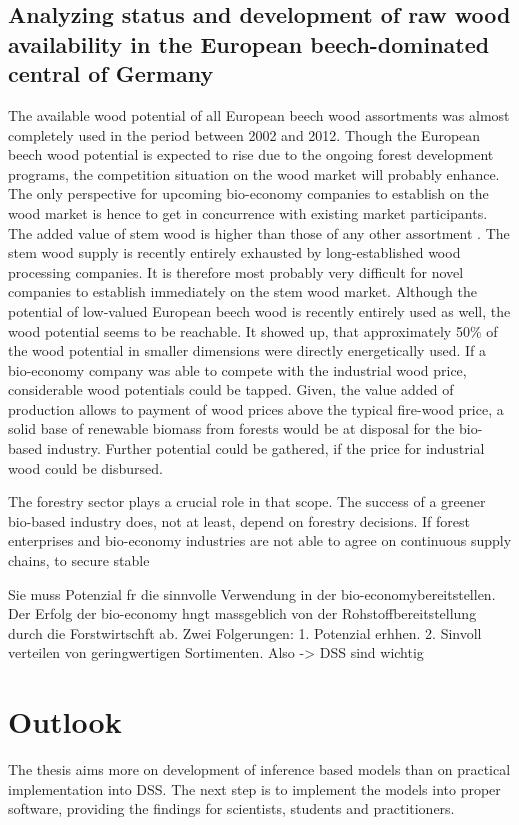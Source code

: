 \subsection{Analyzing status and development of raw wood availability in the European beech-dominated central of Germany}
\label{subsec:discussion:dindings:hzb}
The available wood potential of all European beech wood assortments was almost completely used in the period between 2002 and 2012. Though the European beech wood potential is expected to rise due to the ongoing forest development programs, the competition situation on the wood market will probably enhance. The only perspective for upcoming bio-economy companies to establish on the wood market is hence to get in concurrence with existing market participants. The added value of stem wood is higher than those of any other assortment \citep{nagel_2008}. The stem wood supply is recently entirely exhausted by long-established wood processing companies. It is therefore most probably very difficult for novel companies to establish immediately on the stem wood market. Although the potential of low-valued European beech wood is recently entirely used as well, the wood potential seems to be reachable. It showed up, that approximately 50\% of the wood potential in smaller dimensions were directly energetically used. If a bio-economy company was able to compete with the industrial wood price, considerable wood potentials could be tapped. Given, the value added of production allows to payment of wood prices above the typical fire-wood price, a solid base of renewable biomass from forests would be at disposal for the bio-based industry. Further potential could be gathered, if the price for industrial wood could be disbursed.

The forestry sector plays a crucial role in that scope. The success of a greener bio-based industry does, not at least, depend on forestry decisions. If forest enterprises and bio-economy industries are not able to agree on continuous supply chains, to secure stable 

Sie muss Potenzial fr die sinnvolle Verwendung in der bio-economybereitstellen. Der Erfolg der bio-economy hngt massgeblich von der Rohstoffbereitstellung durch die Forstwirtschft ab. Zwei Folgerungen: 1. Potenzial erhhen. 2. Sinvoll verteilen von geringwertigen Sortimenten.
Also -> DSS sind wichtig

\section{Outlook}
\label{sec:discussion:outlook}
The thesis aims more on development of inference based models than on practical implementation into DSS. The next step is to implement the models into proper software, providing the findings for scientists, students and practitioners.


